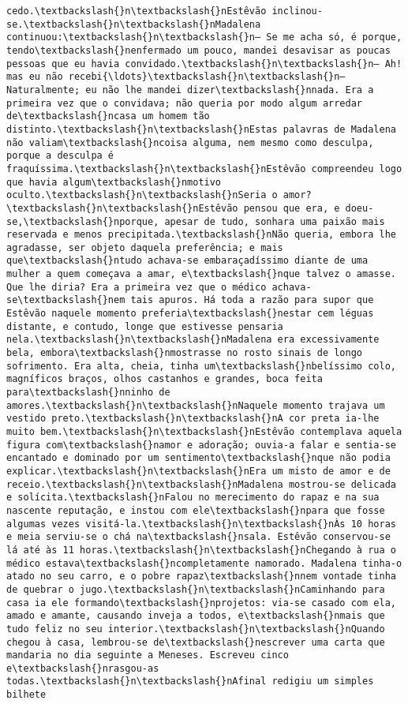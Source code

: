 \documentclass[11pt]{article}
\begin{document}
\begin{Verbatim}[commandchars=\\\{\}]
cedo.\textbackslash{}n\textbackslash{}nEstêvão inclinou-se.\textbackslash{}n\textbackslash{}nMadalena continuou:\textbackslash{}n\textbackslash{}n— Se me acha só, é porque, tendo\textbackslash{}nenfermado um pouco, mandei desavisar as poucas pessoas que eu havia convidado.\textbackslash{}n\textbackslash{}n— Ah! mas eu não recebi{\ldots}\textbackslash{}n\textbackslash{}n— Naturalmente; eu não lhe mandei dizer\textbackslash{}nnada. Era a primeira vez que o convidava; não queria por modo algum arredar de\textbackslash{}ncasa um homem tão distinto.\textbackslash{}n\textbackslash{}nEstas palavras de Madalena não valiam\textbackslash{}ncoisa alguma, nem mesmo como desculpa, porque a desculpa é fraquíssima.\textbackslash{}n\textbackslash{}nEstêvão compreendeu logo que havia algum\textbackslash{}nmotivo oculto.\textbackslash{}n\textbackslash{}nSeria o amor?\textbackslash{}n\textbackslash{}nEstêvão pensou que era, e doeu-se,\textbackslash{}nporque, apesar de tudo, sonhara uma paixão mais reservada e menos precipitada.\textbackslash{}nNão queria, embora lhe agradasse, ser objeto daquela preferência; e mais que\textbackslash{}ntudo achava-se embaraçadíssimo diante de uma mulher a quem começava a amar, e\textbackslash{}nque talvez o amasse. Que lhe diria? Era a primeira vez que o médico achava-se\textbackslash{}nem tais apuros. Há toda a razão para supor que Estêvão naquele momento preferia\textbackslash{}nestar cem léguas distante, e contudo, longe que estivesse pensaria nela.\textbackslash{}n\textbackslash{}nMadalena era excessivamente bela, embora\textbackslash{}nmostrasse no rosto sinais de longo sofrimento. Era alta, cheia, tinha um\textbackslash{}nbelíssimo colo, magníficos braços, olhos castanhos e grandes, boca feita para\textbackslash{}nninho de amores.\textbackslash{}n\textbackslash{}nNaquele momento trajava um vestido preto.\textbackslash{}n\textbackslash{}nA cor preta ia-lhe muito bem.\textbackslash{}n\textbackslash{}nEstêvão contemplava aquela figura com\textbackslash{}namor e adoração; ouvia-a falar e sentia-se encantado e dominado por um sentimento\textbackslash{}nque não podia explicar.\textbackslash{}n\textbackslash{}nEra um misto de amor e de receio.\textbackslash{}n\textbackslash{}nMadalena mostrou-se delicada e solícita.\textbackslash{}nFalou no merecimento do rapaz e na sua nascente reputação, e instou com ele\textbackslash{}npara que fosse algumas vezes visitá-la.\textbackslash{}n\textbackslash{}nÀs 10 horas e meia serviu-se o chá na\textbackslash{}nsala. Estêvão conservou-se lá até às 11 horas.\textbackslash{}n\textbackslash{}nChegando à rua o médico estava\textbackslash{}ncompletamente namorado. Madalena tinha-o atado no seu carro, e o pobre rapaz\textbackslash{}nnem vontade tinha de quebrar o jugo.\textbackslash{}n\textbackslash{}nCaminhando para casa ia ele formando\textbackslash{}nprojetos: via-se casado com ela, amado e amante, causando inveja a todos, e\textbackslash{}nmais que tudo feliz no seu interior.\textbackslash{}n\textbackslash{}nQuando chegou à casa, lembrou-se de\textbackslash{}nescrever uma carta que mandaria no dia seguinte a Meneses. Escreveu cinco e\textbackslash{}nrasgou-as todas.\textbackslash{}n\textbackslash{}nAfinal redigiu um simples bilhete 
\end{Verbatim}
\end{document}

